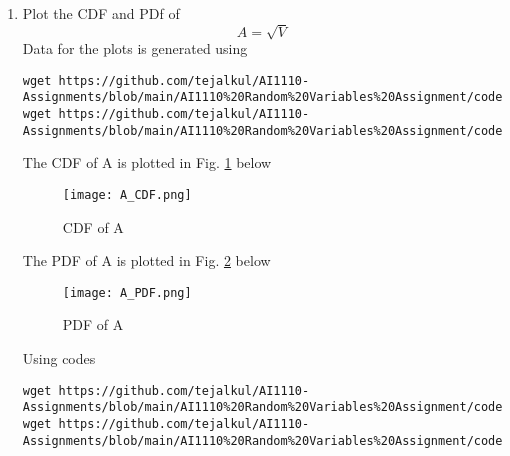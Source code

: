 \documentclass[journal,12pt,twocolumn]{IEEEtran}
\renewcommand\thesection{\arabic{section}}
\begin{document}
\begin{enumerate}[label=\thesection.\arabic*
,ref=\thesection.\theenumi]
\begin{equation}
F_{R}(R) = 
\begin{cases}
1 - e^{\frac{-R^2}{2}} & x \geq 0 \\
0 & x < 0,
\end{cases}
\end{equation}
Now, 
\begin{align}
  F_{V}\brak{x} &= P\brak{V \leq x} \\
                &= P\brak{R^2 \leq x} \\
                &= P\brak{R \leq \sqrt{x}} \\
                &= F_{R}\brak{\sqrt{x}} 
\end{align}
Hence,
\begin{equation}
F_{V}(x) = 
\begin{cases}
1 - e^{\frac{-x}{2}} & x \geq 0 \\
0 & x < 0,
\end{cases}
\end{equation}
\begin{equation}
    \implies \alpha = \frac{1}{2}
\end{equation}



\item
\label{ch3_raleigh_sim}
Plot the CDF and PDf of
%
\begin{equation}
A = \sqrt{V}
\end{equation}
%
\solution
Data for the plots is generated using
\begin{lstlisting}
wget https://github.com/tejalkul/AI1110-Assignments/blob/main/AI1110%20Random%20Variables%20Assignment/codes/exrand.c
wget https://github.com/tejalkul/AI1110-Assignments/blob/main/AI1110%20Random%20Variables%20Assignment/codes/coeffs.h
\end{lstlisting}
The CDF of A is plotted in Fig. \ref{Fig:root_V_cdf} below 
\begin{figure}[!ht]
\texttt{[image: A\_CDF.png]}
\caption{CDF of A}
\label{Fig:root_V_cdf}
\end{figure}

The PDF of A is plotted in Fig. \ref{Fig:root_V_pdf} below 
\begin{figure}[!ht]
\texttt{[image: A\_PDF.png]}
\caption{PDF of A}
\label{Fig:root_V_pdf}
\end{figure} 

Using codes
\begin{lstlisting}
wget https://github.com/tejalkul/AI1110-Assignments/blob/main/AI1110%20Random%20Variables%20Assignment/codes/cdf_plot.py
wget https://github.com/tejalkul/AI1110-Assignments/blob/main/AI1110%20Random%20Variables%20Assignment/codes/pdf_plot.py
\end{lstlisting}
\end{enumerate}
\end{document}

